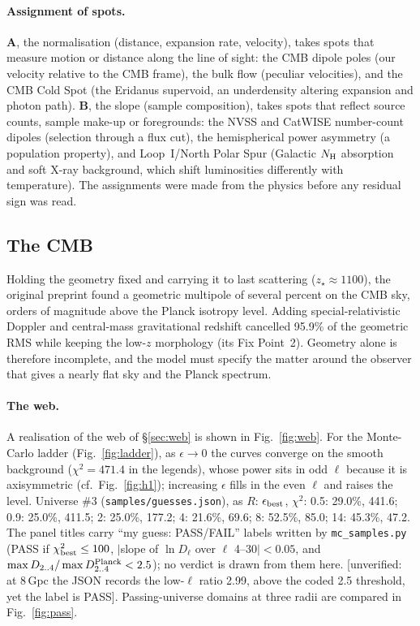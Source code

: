 \documentclass[10pt,twocolumn]{article}
\newcommand{\flag}[1]{\textsf{[unverified: #1]}}
\begin{document}
\paragraph{Assignment of spots.} \textbf{A}, the normalisation (distance, expansion rate, velocity), takes spots that measure motion or distance along the line of sight: the CMB dipole poles (our velocity relative to the CMB frame), the bulk flow (peculiar velocities), and the CMB Cold Spot (the Eridanus supervoid, an underdensity altering expansion and photon path). \textbf{B}, the slope (sample composition), takes spots that reflect source counts, sample make-up or foregrounds: the NVSS and CatWISE number-count dipoles (selection through a flux cut), the hemispherical power asymmetry (a population property), and Loop~I/North Polar Spur (Galactic $N_{\rm H}$ absorption and soft X-ray background, which shift luminosities differently with temperature). The assignments were made from the physics before any residual sign was read.

\subsection{The CMB}\label{sec:cmbres}\label{sec:flatcmb}
Holding the geometry fixed and carrying it to last scattering ($z_\star\approx1100$), the original preprint found a geometric multipole of several percent on the CMB sky, orders of magnitude above the Planck isotropy level. Adding special-relativistic Doppler and central-mass gravitational redshift cancelled 95.9\% of the geometric RMS while keeping the low-$z$ morphology (its Fix Point~2). Geometry alone is therefore incomplete, and the model must specify the matter around the observer that gives a nearly flat sky and the Planck spectrum.

\paragraph{The web.} A realisation of the web of \S\ref{sec:web} is shown in Fig.~\ref{fig:web}. For the Monte-Carlo ladder (Fig.~\ref{fig:ladder}), as $\epsilon\to0$ the curves converge on the smooth background ($\chi^2=471.4$ in the legends), whose power sits in odd $\ell$ because it is axisymmetric (cf.\ Fig.~\ref{fig:h1}); increasing $\epsilon$ fills in the even $\ell$ and raises the level. Universe \#3 (\texttt{samples/guesses.json}), as $R$: $\epsilon_{\rm best}$, $\chi^2$: 0.5: 29.0\%, 441.6; 0.9: 25.0\%, 411.5; 2: 25.0\%, 177.2; 4: 21.6\%, 69.6; 8: 52.5\%, 85.0; 14: 45.3\%, 47.2. The panel titles carry ``my guess: PASS/FAIL'' labels written by \texttt{mc\_samples.py} (PASS if $\chi^2_{\rm best}\le100$, $|$slope of $\ln D_\ell$ over $\ell$ 4--30$|<0.05$, and $\max D_{2..4}/\max D^{\rm Planck}_{2..4}<2.5$); no verdict is drawn from them here. \flag{at 8\,Gpc the JSON records the low-$\ell$ ratio 2.99, above the coded 2.5 threshold, yet the label is PASS}. Passing-universe domains at three radii are compared in Fig.~\ref{fig:pass}.
\end{document}
